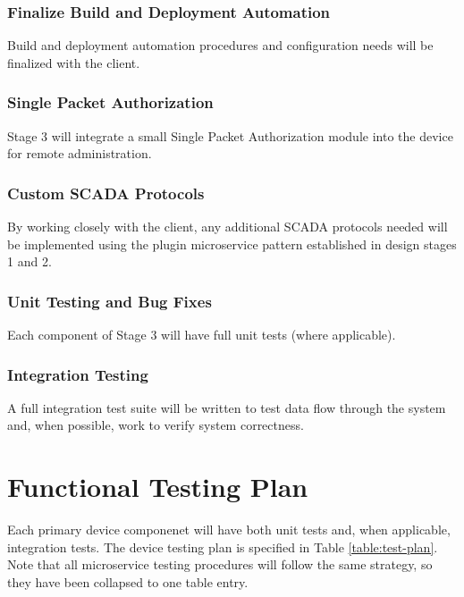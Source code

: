 \subsubsection{Finalize Build and Deployment Automation}

Build and deployment automation procedures and configuration needs will be
finalized with the client.

\subsubsection{Single Packet Authorization}

Stage 3 will integrate a small Single Packet Authorization module into the
device for remote administration.

\subsubsection{Custom SCADA Protocols}

By working closely with the client, any additional SCADA protocols needed will
be implemented using the plugin microservice pattern established in design
stages 1 and 2.

\subsubsection{Unit Testing and Bug Fixes}

Each component of Stage 3 will have full unit tests (where applicable).

\subsubsection{Integration Testing}

A full integration test suite will be written to test data flow through the
system and, when possible, work to verify system correctness.

\section{Functional Testing Plan}

Each primary device componenet will have both unit tests and, when applicable,
integration tests. The device testing plan is specified
in Table \ref{table:test-plan}. Note that all microservice testing procedures
will follow the same strategy, so they have been collapsed to one table
entry.

